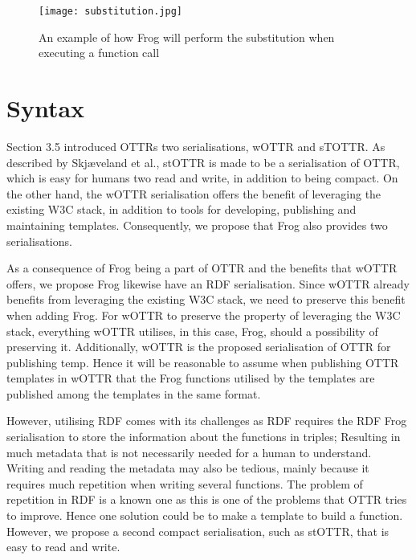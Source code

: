\begin{figure}
    \centering
    \texttt{[image: substitution.jpg]}
    \caption{An example of how Frog will perform the substitution when executing a function call}
    \label{fig:substitution_example}
\end{figure}

\section{Syntax}
Section 3.5 introduced OTTRs two serialisations, wOTTR and sTOTTR. As described by Skjæveland et al., stOTTR is made to be a serialisation of OTTR, which is easy for humans two read and write, in addition to being compact\autocite[4]{SLKK_OTTR_2021}. On the other hand, the wOTTR serialisation offers the benefit of leveraging the existing W3C stack, in addition to tools for developing, publishing and maintaining templates\autocite[481-482]{SLKF_OTTR_2018}. Consequently, we propose that Frog also provides two serialisations.

\para
As a consequence of Frog being a part of OTTR and the benefits that wOTTR offers, we propose Frog likewise have an RDF serialisation. Since wOTTR already benefits from leveraging the existing W3C stack, we need to preserve this benefit when adding Frog. For wOTTR to preserve the property of leveraging the W3C stack, everything wOTTR utilises, in this case, Frog, should a possibility of preserving it.  Additionally, wOTTR is the proposed serialisation of OTTR for publishing temp. Hence it will be reasonable to assume when publishing OTTR templates in wOTTR that the Frog functions utilised by the templates are published among the templates in the same format.  

\para
However, utilising RDF comes with its challenges as RDF requires the RDF Frog serialisation to store the information about the functions in triples; Resulting in much metadata that is not necessarily needed for a human to understand. Writing and reading the metadata may also be tedious, mainly because it requires much repetition when writing several functions. The problem of repetition in RDF is a known one as this is one of the problems that OTTR tries to improve. Hence one solution could be to make a template to build a function. However, we propose a second compact serialisation, such as stOTTR, that is easy to read and write. 

